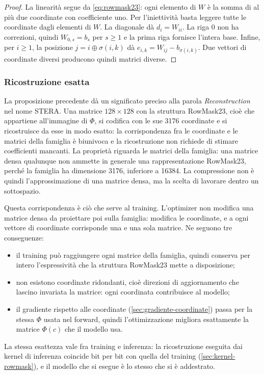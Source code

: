 \begin{proof}
La linearità segue da \eqref{eq:rowmask23}: ogni elemento di $W$ è la somma di al più due coordinate con coefficiente uno. Per l'iniettività basta leggere tutte le coordinate dagli elementi di $W$. La diagonale dà $d_i=W_{ii}$. La riga $0$ non ha correzioni, quindi $W_{0,s}=b_s$ per $s\ge1$ e la prima riga fornisce l'intera base. Infine, per $i\ge1$, la posizione $j=i\oplus\sigma(i,k)$ dà $e_{i,k}=W_{ij}-b_{\sigma(i,k)}$. Due vettori di coordinate diversi producono quindi matrici diverse.
\end{proof}

\subsubsection{Ricostruzione esatta}
\label{sec:esattezza-ricostruzione}

La proposizione precedente dà un significato preciso alla parola \emph{Reconstruction} nel nome STERA. Una matrice $128\times128$ con la struttura RowMask23, cioè che appartiene all'immagine di $\Phi$, si codifica con le sue \num{3176} coordinate e si ricostruisce da esse in modo esatto: la corrispondenza fra le coordinate e le matrici della famiglia è biunivoca e la ricostruzione non richiede di stimare coefficienti mancanti. La proprietà riguarda le matrici della famiglia: una matrice densa qualunque non ammette in generale una rappresentazione RowMask23, perché la famiglia ha dimensione \num{3176}, inferiore a \num{16384}. La compressione non è quindi l'approssimazione di una matrice densa, ma la scelta di lavorare dentro un sottospazio.

Questa corrispondenza è ciò che serve al training. L'optimizer non modifica una matrice densa da proiettare poi sulla famiglia: modifica le coordinate, e a ogni vettore di coordinate corrisponde una e una sola matrice. Ne seguono tre conseguenze:
\begin{itemize}
\item il training può raggiungere ogni matrice della famiglia, quindi conserva per intero l'espressività che la struttura RowMask23 mette a disposizione;
\item non esistono coordinate ridondanti, cioè direzioni di aggiornamento che lascino invariata la matrice: ogni coordinata contribuisce al modello;
\item il gradiente rispetto alle coordinate (\autoref{sec:gradiente-coordinate}) passa per la stessa $\Phi$ usata nel forward, quindi l'ottimizzazione migliora esattamente la matrice $\Phi(c)$ che il modello usa.
\end{itemize}
La stessa esattezza vale fra training e inferenza: la ricostruzione eseguita dai kernel di inferenza coincide bit per bit con quella del training (\autoref{sec:kernel-rowmask}), e il modello che si esegue è lo stesso che si è addestrato.

